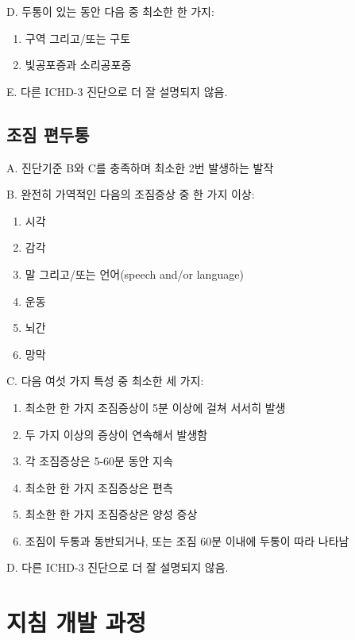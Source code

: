 \documentclass[]{book}
\providecommand{\tightlist}{%
  \setlength{\itemsep}{0pt}\setlength{\parskip}{0pt}}
\begin{document}
D. 두통이 있는 동안 다음 중 최소한 한 가지:

\begin{enumerate}
\def\labelenumi{\arabic{enumi}.}
\tightlist
\item
  구역 그리고/또는 구토
\item
  빛공포증과 소리공포증
\end{enumerate}

E. 다른 ICHD-3 진단으로 더 잘 설명되지 않음.

\hypertarget{section-27}{%
\section*{조짐 편두통}\label{section-27}}

A. 진단기준 B와 C를 충족하며 최소한 2번 발생하는 발작

B. 완전히 가역적인 다음의 조짐증상 중 한 가지 이상:

\begin{enumerate}
\def\labelenumi{\arabic{enumi}.}
\tightlist
\item
  시각
\item
  감각
\item
  말 그리고/또는 언어(speech and/or language)
\item
  운동
\item
  뇌간
\item
  망막
\end{enumerate}

C. 다음 여섯 가지 특성 중 최소한 세 가지:

\begin{enumerate}
\def\labelenumi{\arabic{enumi}.}
\tightlist
\item
  최소한 한 가지 조짐증상이 5분 이상에 걸쳐 서서히 발생
\item
  두 가지 이상의 증상이 연속해서 발생함
\item
  각 조짐증상은 5-60분 동안 지속
\item
  최소한 한 가지 조짐증상은 편측
\item
  최소한 한 가지 조짐증상은 양성 증상
\item
  조짐이 두통과 동반되거나, 또는 조짐 60분 이내에 두통이 따라 나타남
\end{enumerate}

D. 다른 ICHD-3 진단으로 더 잘 설명되지 않음.

\hypertarget{section-28}{%
\chapter{지침 개발 과정}\label{section-28}}
\end{document}
